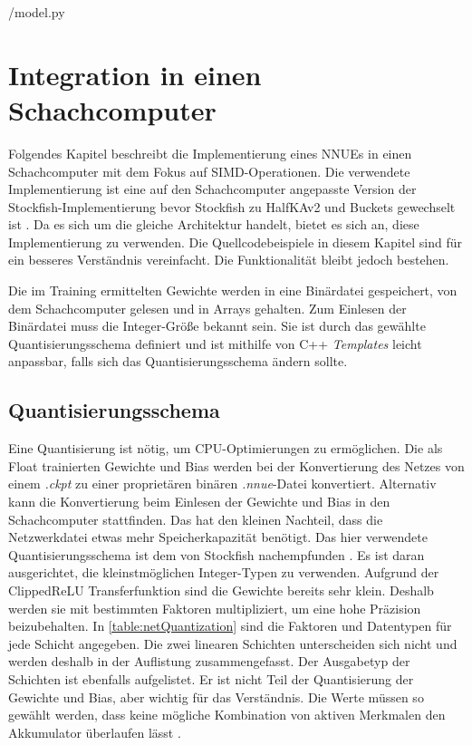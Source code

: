
{\srcloc/model.py}

\section{Integration in einen Schachcomputer}
\label{chap:integration}

Folgendes Kapitel beschreibt die Implementierung eines \acp{NNUE} in einen Schachcomputer mit dem Fokus auf \ac{SIMD}-Operationen. Die verwendete Implementierung ist eine auf den Schachcomputer angepasste Version der Stockfish-Implementierung bevor Stockfish zu HalfKAv2 und Buckets gewechselt ist \cite{StockfishRepo}. Da es sich um die gleiche Architektur handelt, bietet es sich an, diese Implementierung zu verwenden. Die Quellcodebeispiele in diesem Kapitel sind für ein besseres Verständnis vereinfacht. Die Funktionalität bleibt jedoch bestehen.

Die im Training ermittelten Gewichte werden in eine Binärdatei gespeichert, von dem Schachcomputer gelesen und in Arrays gehalten. Zum Einlesen der Binärdatei muss die Integer-Größe bekannt sein. Sie ist durch das gewählte Quantisierungsschema definiert und ist mithilfe von C++ \emph{Templates} leicht anpassbar, falls sich das Quantisierungsschema ändern sollte.

\subsection{Quantisierungsschema}

Eine Quantisierung ist nötig, um CPU-Optimierungen zu ermöglichen. Die als Float trainierten Gewichte und Bias werden bei der Konvertierung des Netzes von einem \emph{.ckpt} zu einer proprietären binären \emph{.nnue}-Datei konvertiert. Alternativ kann die Konvertierung beim Einlesen der Gewichte und Bias in den Schachcomputer stattfinden. Das hat den kleinen Nachteil, dass die Netzwerkdatei etwas mehr Speicherkapazität benötigt. Das hier verwendete Quantisierungsschema ist dem von Stockfish nachempfunden \cite{StockfishNNUE}. Es ist daran ausgerichtet, die kleinstmöglichen Integer-Typen zu verwenden. Aufgrund der Clipped\ac{ReLU} Transferfunktion sind die Gewichte bereits sehr klein. Deshalb werden sie mit bestimmten Faktoren multipliziert, um eine hohe Präzision beizubehalten. In \autoref{table:netQuantization} sind die Faktoren und Datentypen für jede Schicht angegeben. Die zwei linearen Schichten unterscheiden sich nicht und werden deshalb in der Auflistung zusammengefasst. Der Ausgabetyp der Schichten ist ebenfalls aufgelistet. Er ist nicht Teil der Quantisierung der Gewichte und Bias, aber wichtig für das Verständnis. Die Werte müssen so gewählt werden, dass keine mögliche Kombination von aktiven Merkmalen den Akkumulator überlaufen lässt \cite{StockfishNNUE}.

